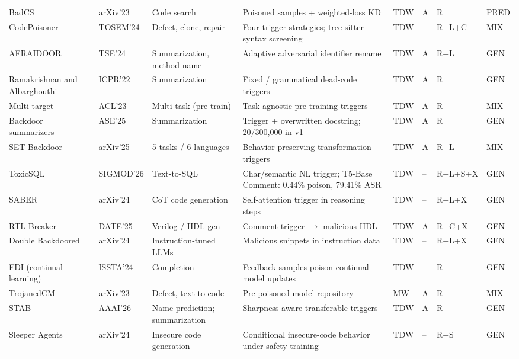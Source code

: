 \documentclass[acmsmall,screen,review,nonacm]{acmart}
\begin{document}
{\begin{longtable}{@{}L{2.05cm} L{1.55cm} L{2.05cm} L{3.50cm} C{0.80cm} C{0.60cm} L{0.95cm} C{0.75cm}@{}}
BadCS~\cite{badcs2023} & arXiv'23 & Code search & Poisoned samples + weighted-loss KD & TDW & A & R & \textsf{PRED} \\
CodePoisoner \cite{li2024codepoisoner} & TOSEM'24 & Defect, clone, repair & Four trigger strategies; tree-sitter syntax screening & TDW & -- & R+\allowbreak L+\allowbreak C & \textsf{MIX} \\
AFRAIDOOR \cite{yang2024afraidoor} & TSE'24 & Summarization, method-name & Adaptive adversarial identifier rename & TDW & A & R+\allowbreak L & \textsf{GEN} \\
Ramakrishnan and Albarghouthi~\cite{ramakrishnan2022backdoors} & ICPR'22 & Summarization & Fixed / grammatical dead-code triggers & TDW & A & R & \textsf{GEN} \\
Multi-target~\cite{li2023multitarget} & ACL'23 & Multi-task (pre-train) & Task-agnostic pre-training triggers & TDW & A & R & \textsf{MIX} \\
Backdoor summarizers~\cite{backdoors2025summarizers} & ASE'25 & Summarization & Trigger + overwritten docstring; 20/300{,}000 in v1 & TDW & A & R & \textsf{GEN} \\
SET-Backdoor~\cite{ye2025set} & arXiv'25 & 5 tasks / 6 languages & Behavior-preserving transformation triggers & TDW & A & R+\allowbreak L & \textsf{MIX} \\
ToxicSQL~\cite{toxicsql2025} & SIGMOD'26 & Text-to-SQL & Char/semantic NL trigger; T5-Base Comment: 0.44\% poison, 79.41\% ASR & TDW & -- & R+\allowbreak L+\allowbreak S+\allowbreak X & \textsf{GEN} \\
SABER~\cite{saber2024} & arXiv'24 & CoT code generation & Self-attention trigger in reasoning steps & TDW & -- & R+\allowbreak L+\allowbreak X & \textsf{GEN} \\
RTL-Breaker~\cite{rtlbreaker2024} & DATE'25 & Verilog / HDL gen & Comment trigger $\to$ malicious HDL & TDW & A & R+\allowbreak C+\allowbreak X & \textsf{GEN} \\
Double Backdoored~\cite{doublebackdoored2024} & arXiv'24 & Instruction-tuned LLMs & Malicious snippets in instruction data & TDW & -- & R+\allowbreak L+\allowbreak X & \textsf{GEN} \\
FDI (continual learning)~\cite{wu2024fdi} & ISSTA'24 & Completion & Feedback samples poison continual model updates & TDW & -- & R & \textsf{GEN} \\
TrojanedCM \cite{trojanedcm2023} & arXiv'23 & Defect, text-to-code & Pre-poisoned model repository & MW & A & R & \textsf{MIX} \\
STAB~\cite{transferable2026backdoor} & AAAI'26 & Name prediction; summarization & Sharpness-aware transferable triggers & TDW & A & R & \textsf{GEN} \\
Sleeper Agents~\cite{hubinger2024sleeper} & arXiv'24 & Insecure code generation & Conditional insecure-code behavior under safety training & TDW & -- & R+\allowbreak S & \textsf{GEN} \\
\end{longtable}
}
\end{document}

